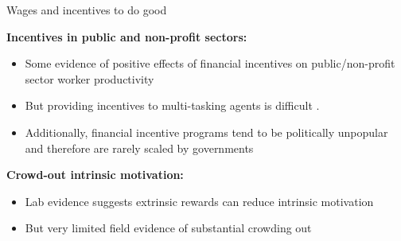 \documentclass[aspectratio=169, 10pt, handout]{beamer}
\newenvironment{wideitemize}{\itemize\addtolength{\itemsep}{10pt}}{\enditemize}
\begin{document}
\begin{frame}{Wages and incentives to do good}

\begin{wideitemize}

	\item \textbf{Incentives in public and non-profit sectors:}
	
	\begin{itemize}

		\item Some evidence of positive effects of financial incentives on public/non-profit sector worker productivity \citep{duflo2012incentives,muralidharan2011teacher}

		\item But providing incentives to multi-tasking agents is difficult \citep{holmstrom1991multitask}.
		
		\item Additionally, financial incentive programs tend to be politically unpopular and therefore are rarely scaled by governments \citep{finan2017personnel}

	\end{itemize}

	\item \textbf{Crowd-out intrinsic motivation:}
	
	\begin{itemize}

		\item Lab evidence suggests extrinsic rewards can reduce intrinsic motivation \citep{deci1971effects,benabou2003intrinsic}

		\item But very limited field evidence of substantial crowding out \citep{lacetera2013economic}

	\end{itemize}
	
\end{wideitemize}

\end{frame}
\end{document}
